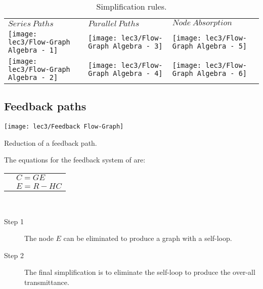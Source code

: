 

\begin{table}[!h]
	\begin{tabular}{>{\centering\arraybackslash}m{3.5cm} | >{\centering\arraybackslash}m{3.5cm} | >{\centering\arraybackslash}m{3.5cm}}
	       \small $Series\ Paths$ &\small $Parallel\ Paths$ &\small $Node\ Absorption$\\[+1mm]
	       \texttt{[image: lec3/Flow-Graph Algebra - 1]}&
	       \texttt{[image: lec3/Flow-Graph Algebra - 3]}&
	       \texttt{[image: lec3/Flow-Graph Algebra - 5]}\\
	       \texttt{[image: lec3/Flow-Graph Algebra - 2]}&
	       \texttt{[image: lec3/Flow-Graph Algebra - 4]}&
	       \texttt{[image: lec3/Flow-Graph Algebra - 6]}\\
	\end{tabular}
	\caption{Simplification rules.}
\end{table}

\justify
\subsection{Feedback paths}

\begin{marginfigure}[-0.4233401538135892cm]
		\texttt{[image: lec3/Feedback Flow-Graph]}
		\caption{Reduction of a feedback path.}
\end{marginfigure}

The equations for the feedback system of  are:\\
\begin{tabular}{p{8cm}p{2cm}}
	&$C=GE$\\
	&$E=R-HC$\\
\end{tabular}
\\
\begin{description}
	\item[Step 1]  The node $E$ can be eliminated to produce a graph with a self-loop.\\[+2.65em]
	\item[Step 2]  The final simplification is to eliminate the self-loop to produce the over-all transmittance.
\end{description}


